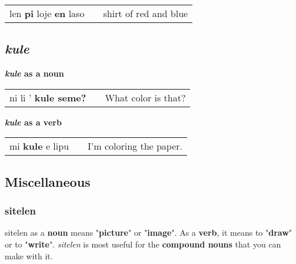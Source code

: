 \begin{supertabular}{p{5,5cm}|ll}
len \textbf{pi} loje \textbf{en} laso && shirt of red and blue \\
\end{supertabular} 
%
\subsection*{\textit{kule}}
%
\textbf{\textit{kule} as a noun} \\
\begin{supertabular}{p{5,5cm}|ll}
ni li ' \textbf{kule seme?} && What color is that? \\
\end{supertabular} 

\textbf{\textit{kule} as a verb} \\
\begin{supertabular}{p{5,5cm}|ll}
mi \textbf{kule} e lipu && I'm coloring the paper. \\
\end{supertabular} 
%
\subsection*{Miscellaneous}
\subsubsection*{sitelen}
%
sitelen as a \textbf{noun} means "\textbf{picture}" or "\textbf{image}". 
As a \textbf{verb}, it means to "\textbf{draw}" or to "\textbf{write}". 
\textit{sitelen} is most useful for the \textbf{compound nouns} that you can make with it. 

